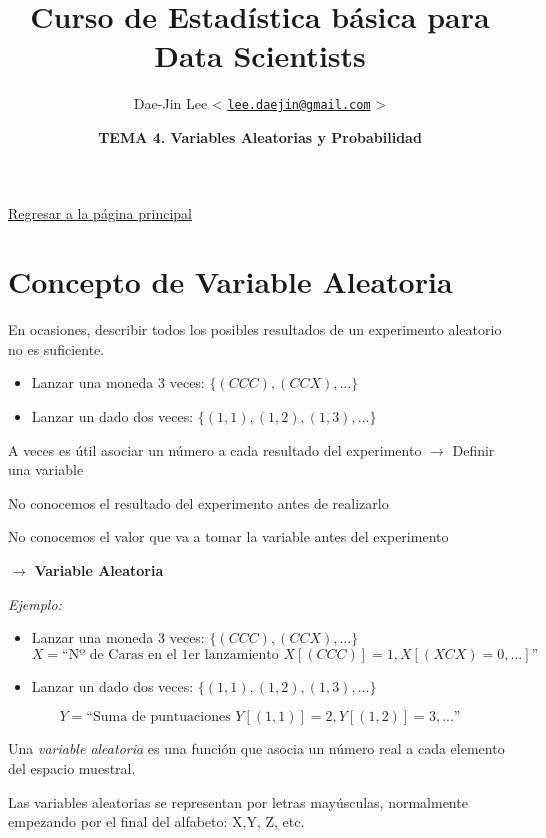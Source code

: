 \documentclass[]{article}
\title{\textbf{Curso de Estadística básica para Data Scientists}}
\author{Dae-Jin Lee \textless{}
\href{mailto:lee.daejin@gmail.com}{\nolinkurl{lee.daejin@gmail.com}}
\textgreater{}}
\date{\textbf{TEMA 4. Variables Aleatorias y Probabilidad}}
\def\tightlist{}
\numberwithin{equation}{section}
\begin{document}
\maketitle

{
\hypersetup{linkcolor=black}
\setcounter{tocdepth}{2}
\tableofcontents
}
\newpage

\href{https://idaejin.github.io/bcam-courses/R/datahack/}{Regresar a la
página principal}

\section{Concepto de Variable
Aleatoria}\label{concepto-de-variable-aleatoria}

En ocasiones, describir todos los posibles resultados de un experimento
aleatorio no es suficiente.

\begin{itemize}
\tightlist
\item
  Lanzar una moneda 3 veces: \(\{(CCC), (CCX), ...\}\)
\item
  Lanzar un dado dos veces: \(\{(1,1), (1,2), (1,3), ...\}\)
\end{itemize}

A veces es útil asociar un número a cada resultado del experimento
\(\rightarrow\) Definir una variable

No conocemos el resultado del experimento antes de realizarlo

No conocemos el valor que va a tomar la variable antes del experimento

\(\rightarrow\) \textbf{Variable Aleatoria}

\emph{Ejemplo:}

\begin{itemize}
\item
  Lanzar una moneda 3 veces: \(\{(CCC), (CCX), ...\}\) \[
    X = \mbox{``Nº de Caras en el 1er lanzamiento $X[(CCC)]=1,X[(XCX)=0,...]$''}
    \]
\item
  Lanzar un dado dos veces: \(\{(1,1), (1,2), (1,3), ...\}\)
\end{itemize}

\[
      Y = \mbox{``Suma de puntuaciones $Y[(1,1)]=2,Y[(1,2)]=3,...$''}
  \]

Una \emph{variable aleatoria} es una función que asocia un número real a
cada elemento del espacio muestral.

Las variables aleatorias se representan por letras mayúsculas,
normalmente empezando por el final del alfabeto: X,Y, Z, etc.
\end{document}
